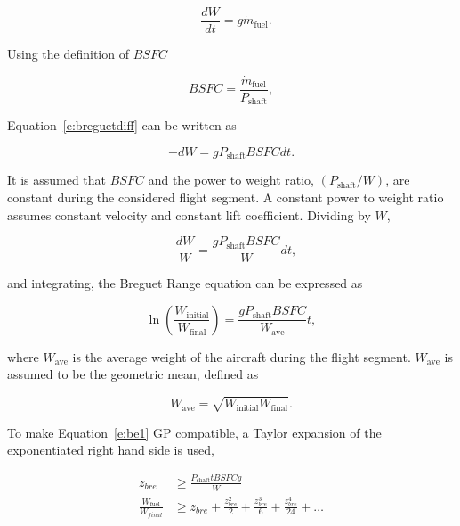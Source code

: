 \documentclass[]{aiaa-tc}%
\begin{document}
\begin{equation}
    \label{e:breguetdiff}
    -\frac{dW}{dt} = g\dot{m}_{\text{fuel}}.
\end{equation}

Using the definition of $BSFC$

\begin{equation}
    \label{e:brBSFC}
    BSFC = \frac{\dot{m}_{\text{fuel}}}{P_{\text{shaft}}},
\end{equation}

Equation~\ref{e:breguetdiff} can be written as

\begin{equation}
    \label{e:brdiff2}
    -dW = g P_{\text{shaft}} BSFC dt.
\end{equation}

It is assumed that $BSFC$ and the power to weight ratio, $(P_{\text{shaft}}/W)$, are constant during the considered flight segment. 
A constant power to weight ratio assumes constant velocity and constant lift coefficient.\cite{br2}
Dividing by $W$,

\begin{equation}
    \label{e:brdiff2}
    -\frac{dW}{W} = \frac{g P_{\text{shaft}}BSFC }{W} dt,
\end{equation}

and integrating, the Breguet Range equation can be expressed as

\begin{equation}
    \label{e:be1}
    \ln{\left( \frac{W_{\text{initial}}}{W_{\text{final}}} \right)} = \frac{gP_{\text{shaft}}BSFC}{W_{\text{ave}}} t,
\end{equation}

where $W_{\text{ave}}$ is the average weight of the aircraft during the flight segment.  $W_{\text{ave}}$ is assumed to be the geometric mean, defined as

\begin{equation}
    \label{e:gpmean}
    W_{\text{ave}} = \sqrt{W_{\text{initial}}W_{\text{final}}}.
\end{equation}

    To make Equation~\ref{e:be1} GP compatible, a Taylor expansion of the exponentiated right hand side is used,\cite{hoburgthesis}

\begin{align}
    \label{e:brzbre}
    z_{bre} &\geq \frac{P_{\text{shaft}}t BSFC g}{W}\\
    \label{e:brtaylor}
    \frac{W_{\text{fuel}}}{W_{final}} &\geq z_{bre} + \frac{z_{bre}^2}{2} + \frac{z_{bre}^3}{6} + \frac{z_{bre}^4}{24} + \dots
\end{align}
\end{document}
